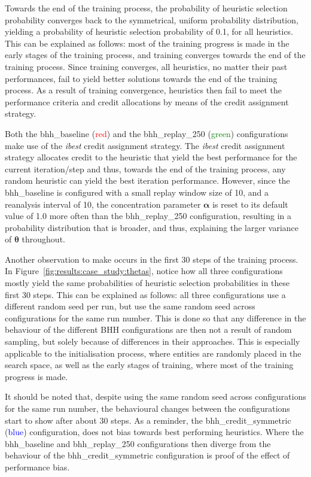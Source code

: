 Towards the end of the training process, the probability of heuristic selection probability converges back to the symmetrical, uniform probability distribution, yielding a probability of heuristic selection probability of 0.1, for all heuristics. This can be explained as follows: most of the training progress is made in the early stages of the training process, and training converges towards the end of the training process. Since training converges, all heuristics, no matter their past performances, fail to yield better solutions towards the end of the training process. As a result of training convergence, heuristics then fail to meet the performance criteria and credit allocations by means of the credit assignment strategy.

Both the bhh\_baseline (\textcolor{red}{red}) and the bhh\_replay\_250 (\textcolor{green}{green}) configurations make use of the \textit{ibest} credit assignment strategy. The \textit{ibest} credit assignment strategy allocates credit to the heuristic that yield the best performance for the current iteration/step and thus, towards the end of the training process, any random heuristic can yield the best iteration performance. However, since the bhh\_baseline is configured with a small replay window size of 10, and a reanalysis interval of 10, the concentration parameter $\boldsymbol{\alpha}$ is reset to its default value of 1.0 more often than the bhh\_replay\_250 configuration, resulting in a probability distribution that is broader, and thus, explaining the larger variance of $\boldsymbol{\theta}$ throughout.

Another observation to make occurs in the first 30 steps of the training process. In Figure~\ref{fig:results:case_study:thetas}, notice how all three configurations mostly yield the same probabilities of heuristic selection probabilities in these first 30 steps. This can be explained as follows: all three configurations use a different random seed per run, but use the same random seed across configurations for the same run number. This is done so that any difference in the behaviour of the different \acs{BHH} configurations are then not a result of random sampling, but solely because of differences in their approaches. This is especially applicable to the initialisation process, where entities are randomly placed in the search space, as well as the early stages of training, where most of the training progress is made.

It should be noted that, despite using the same random seed across configurations for the same run number, the behavioural changes between the configurations start to show after about 30 steps. As a reminder, the bhh\_credit\_symmetric (\textcolor{blue}{blue}) configuration, does not bias towards best performing heuristics. Where the bhh\_baseline and bhh\_replay\_250 configurations then diverge from the behaviour of the bhh\_credit\_symmetric configuration is proof of the effect of performance bias.

